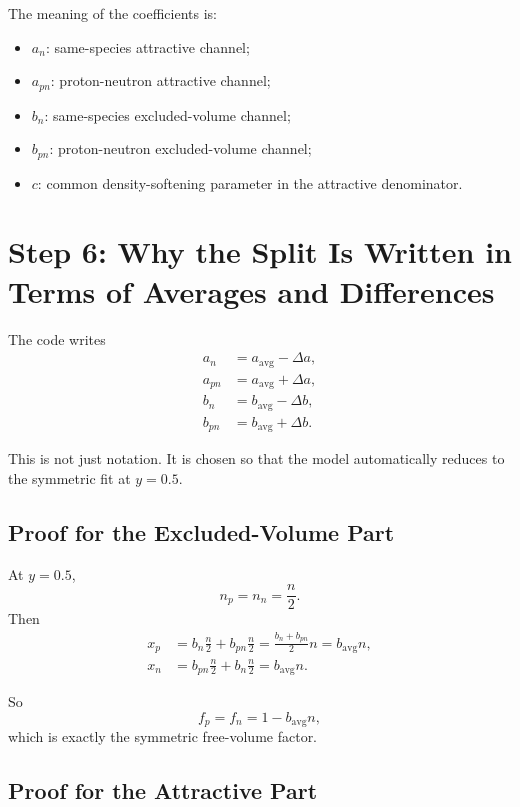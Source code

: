 \documentclass[11pt]{article}
\begin{document}
The meaning of the coefficients is:
\begin{itemize}
\item $a_n$: same-species attractive channel;
\item $a_{pn}$: proton-neutron attractive channel;
\item $b_n$: same-species excluded-volume channel;
\item $b_{pn}$: proton-neutron excluded-volume channel;
\item $c$: common density-softening parameter in the attractive denominator.
\end{itemize}

\section{Step 6: Why the Split Is Written in Terms of Averages and Differences}

The code writes
\begin{align}
a_n &= a_{\mathrm{avg}}-\Delta a, \\
a_{pn} &= a_{\mathrm{avg}}+\Delta a, \\
b_n &= b_{\mathrm{avg}}-\Delta b, \\
b_{pn} &= b_{\mathrm{avg}}+\Delta b.
\end{align}

This is not just notation. It is chosen so that the model automatically reduces
to the symmetric fit at $y=0.5$.

\subsection{Proof for the Excluded-Volume Part}

At $y=0.5$,
\[
n_p=n_n=\frac{n}{2}.
\]
Then
\begin{align}
x_p
&=
b_n\frac{n}{2}+b_{pn}\frac{n}{2}
=
\frac{b_n+b_{pn}}{2}n
=
b_{\mathrm{avg}}n, \\
x_n
&=
b_{pn}\frac{n}{2}+b_n\frac{n}{2}
=
b_{\mathrm{avg}}n.
\end{align}

So
\begin{equation}
f_p=f_n=1-b_{\mathrm{avg}}n,
\end{equation}
which is exactly the symmetric free-volume factor.

\subsection{Proof for the Attractive Part}
\end{document}
